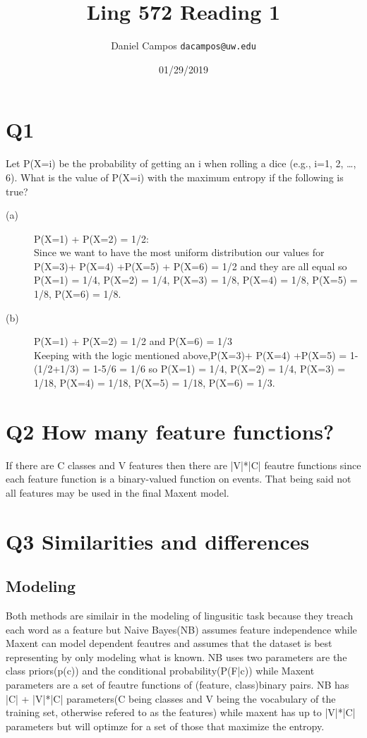 \documentclass[11pt]{article}
\begin{document}
\title{Ling 572 Reading 1}
\author{Daniel Campos  \tt {dacampos@uw.edu}}
\date{01/29/2019}
\maketitle 
\section{ Q1}
Let P(X=i) be the probability of getting an i
when rolling a dice (e.g., i=1, 2, …, 6). What is
the value of P(X=i) with the maximum entropy
if the following is true?
\begin{description}
\item [(a)] P(X=1) + P(X=2) = 1/2: \\ Since we want to have the most uniform distribution our values for P(X=3)+ P(X=4) +P(X=5) + P(X=6) = 1/2 and they are all equal so P(X=1) = 1/4, P(X=2) = 1/4, P(X=3) = 1/8, P(X=4) = 1/8, P(X=5) = 1/8, P(X=6) = 1/8. 
\item [(b)] P(X=1) + P(X=2) = 1/2 and P(X=6) = 1/3 \\ Keeping with the logic mentioned above,P(X=3)+ P(X=4) +P(X=5) = 1-(1/2+1/3) = 1-5/6 = 1/6  so P(X=1) = 1/4, P(X=2) = 1/4, P(X=3) = 1/18, P(X=4) = 1/18, P(X=5) = 1/18, P(X=6) = 1/3. 
\end{description}
\section{ Q2  How many feature functions?}
If there are C classes and V features then there are |V|*|C| feautre functions since each feature function is a binary-valued function on events. That being said not all features may be used in the final Maxent model.
\section{ Q3 Similarities and differences}
\subsection{Modeling}
Both methods are similair in the modeling of lingusitic task because they treach each word as a feature but Naive Bayes(NB) assumes feature independence while Maxent can model dependent feautres and assumes that the dataset is best representing by only modeling what is known. NB uses two parameters are the class priors(p(c)) and the conditional probability(P(F|c)) while Maxent parameters are a set of feautre functions of (feature, class)binary pairs. NB has |C| + |V|*|C| parameters(C being classes and V being the vocabulary of the training set, otherwise refered to as the features) while maxent has up to |V|*|C| parameters but will optimze for a set of those that maximize the entropy. 
\end{document}
